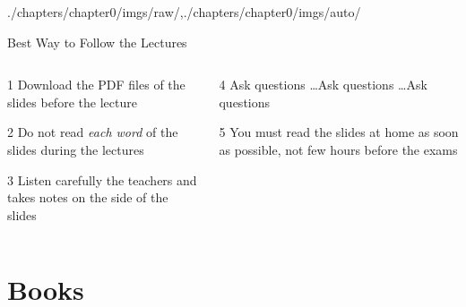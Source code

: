 \begin{graphicspathcontext}{{./chapters/chapter0/imgs/raw/},{./chapters/chapter0/imgs/auto/}}
\begin{frame}{Best Way to Follow the Lectures}
	\begin{columns}
		\begin{column}{.5\linewidth}
			\begin{rightanchorblock}{}{1}
				Download the PDF files of the slides before the lecture
			\end{rightanchorblock}
			\begin{rightanchorblock}{}{2}
				Do not read \emph{each word} of the slides during the lectures
			\end{rightanchorblock}
			\begin{rightanchorblock}{}{3}
				Listen carefully the teachers and takes notes on the side of the slides
			\end{rightanchorblock}
		\end{column}
		\begin{column}{.5\linewidth}
			\begin{leftanchorblock}{}{4}
				Ask questions \dots Ask questions \dots Ask questions
			\end{leftanchorblock}
			\vspace{.5cm}
			\begin{leftanchorblock}{}{5}
				You must read the slides at home as soon as possible, not few hours before the exams
			\end{leftanchorblock}
		\end{column}
	\end{columns}
\end{frame}

\section{Books}




\end{graphicspathcontext}
